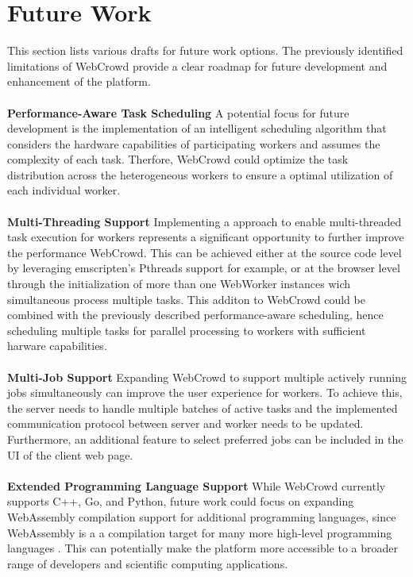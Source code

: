 \section{Future Work}
\label{sec:conclusion:future_work}
This section lists various drafts for future work options. The previously identified limitations of WebCrowd provide a clear roadmap for future development and enhancement of the platform.  
\\~\\
\textbf{Performance-Aware Task Scheduling}
\newline
A potential focus for future development is the implementation of an intelligent scheduling algorithm that considers the hardware capabilities of participating workers and assumes the complexity of each task. Therfore, WebCrowd could optimize the task distribution across the heterogeneous workers to ensure a optimal utilization of each individual worker.
\\~\\
\textbf{Multi-Threading Support}
\newline
Implementing a approach to enable multi-threaded task execution for workers represents a significant opportunity to further improve the performance WebCrowd. This can be achieved either at the source code level by leveraging emscripten's Pthreads support \cite{methodology:emcc} for example, or at the browser level through the initialization of more than one WebWorker instances wich simultaneous process multiple tasks. This additon to WebCrowd could be combined with the previously described performance-aware scheduling, hence scheduling multiple tasks for parallel processing to workers with sufficient harware capabilities.
\\~\\
\textbf{Multi-Job Support}
Expanding WebCrowd to support multiple actively running jobs simultaneously can improve the user experience for workers. To achieve this, the server needs to handle multiple batches of active tasks and the implemented communication protocol between server and worker needs to be updated. Furthermore, an additional feature to select preferred jobs can be included in the \ac{UI} of the client web page.  
\\~\\
\textbf{Extended Programming Language Support}
While WebCrowd currently supports C++, Go, and Python, future work could focus on expanding WebAssembly compilation support for additional programming languages, since WebAssembly is a a compilation target for many more high-level programming languages \cite{methodology:wasm, methodology:wasmW3C, methodology:wasm2}. This can potentially make the platform more accessible to a broader range of developers and scientific computing applications.
